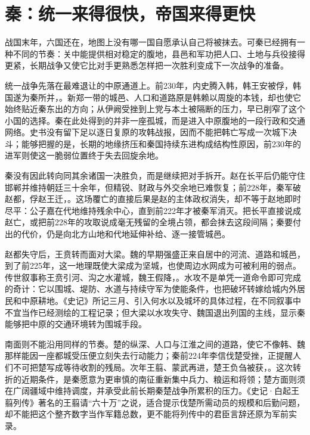 \section{秦：统一来得很快，帝国来得更快}

战国末年，六国还在，地图上没有哪一国自愿承认自己将被抹去。可秦已经拥有一种不同的节奏：关中能提供相对稳定的腹地，县邑和军功把人口、土地与兵役接得更紧，长期战争又使它比对手更熟悉怎样把一次胜利变成下一次战争的准备。


统一战争先落在最难退让的中原通道上。前230年，内史腾入韩，韩王安被俘，韩国遂为秦所并，。新郑一带的城邑、人口和道路原是韩赖以周旋的本钱，却也使它始终贴近秦东出的方向；从伊阙受挫到上党与本土被隔断的压力，早已削窄了这个小国的选择。秦在此处得到的并非一座孤城，而是进入中原腹地的一段行政和交通网络。史书没有留下足以逐日复原的攻韩战报，因而不能把韩亡写成一次城下决斗；能够把握的是，长期的地缘挤压和秦国持续东进构成结构性原因，前230年的进军则使这一脆弱位置终于失去回旋余地。

秦没有因此转向同其余诸国一决胜负，而是继续把对手拆开。赵在长平后仍能守住邯郸并维持朝廷三十余年，但精锐、财政与外交余地已难恢复；前228年，秦军破赵都，俘赵王迁，。这场覆亡的直接后果是赵的主体政权消失，却不等于赵地即时尽平：公子嘉在代地维持残余中心，直到前222年才被秦军消灭。把长平直接说成赵亡，或把前228年的攻取说成毫无残留的全境占领，都会抹去这段间隔；秦要付出的代价，仍是向北方山地和代地延伸补给、逐一接管城邑。

赵都失守后，王贲转而面对大梁。魏的早期强盛正来自居中的河流、道路和城邑，到了前225年，这一地理既使大梁成为坚城，也使周边水网成为可被利用的弱点。传世叙事称王贲引河、沟之水灌城，魏王假降，。水攻不是单凭一道命令即可完成的奇计：它以围城、堤防、水道与持续守军为使能条件，也把破坏转嫁给城内外居民和中原耕地。《史记》所记三月、引入何水以及城坏的具体过程，在不同叙事中不宜当作已经测绘的工程记录；但大梁以水攻失守、魏国退出列国的主线，显示秦能够把中原的交通环境转为围城手段。

南面则不能沿用同样的节奏。楚的纵深、人口与江淮之间的道路，使它不像韩、魏那样能因一座都城受压便立刻失去行动能力；秦前224年李信伐楚受挫，正提醒人们不可把楚写成等待收割的残局。次年王翦、蒙武再进，楚王负刍被获，。这次转折的近期条件，是秦愿意为更审慎的南征重新集中兵力、粮运和将领；楚方面则须在广阔疆域中维持调度，并承受此前长期秦楚战争所累积的压力。《史记·白起王翦列传》著名的王翦请“六十万”之说，适合提示伐楚所需动员的规模和后勤问题，却不能把这个整齐数字当作军籍总数，更不能将列传中的君臣言辞还原为军前实录。

